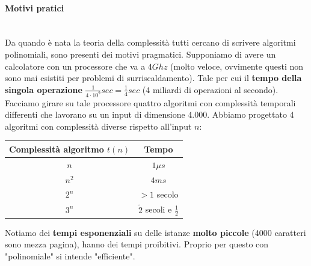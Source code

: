 \documentclass{article}
\begin{document}
\paragraph{Motivi pratici}\mbox{}\\
Da quando è nata la teoria della complessità tutti cercano di scrivere algoritmi
polinomiali, sono presenti dei motivi pragmatici. Supponiamo di avere un calcolatore
con un processore che va a $4Ghz$ (molto veloce, ovvimente questi non sono mai esistiti per
problemi di surriscaldamento).
Tale per cui il \textbf{tempo della singola operazione} $\frac{1}{4\cdot 10^9}sec=\frac{1}{4}sec$ (4
miliardi di operazioni al secondo).\newline\newline
Facciamo girare su tale processore quattro algoritmi con complessità temporali differenti che lavorano su un
input di dimensione $4.000$. Abbiamo progettato 4 algoritmi con complessità diverse rispetto
all'input $n$:
\begin{center}
    \begin{tabular}{c|c}
        Complessità algoritmo $t(n)$ & Tempo                             \\
        \midrule
        $n$                          & $1\mu s$                          \\
        $n^2$                        & $4ms$                             \\
        $2^n$                        & $>1$ secolo                       \\
        $3^n$                        & $\tilde 2$ secoli e $\frac{1}{2}$
    \end{tabular}
\end{center}
Notiamo dei \textbf{tempi esponenziali} su delle istanze \textbf{molto piccole} (4000 caratteri sono mezza
pagina), hanno dei tempi proibitivi. Proprio per questo con "polinomiale" si intende "efficiente".
\end{document}
